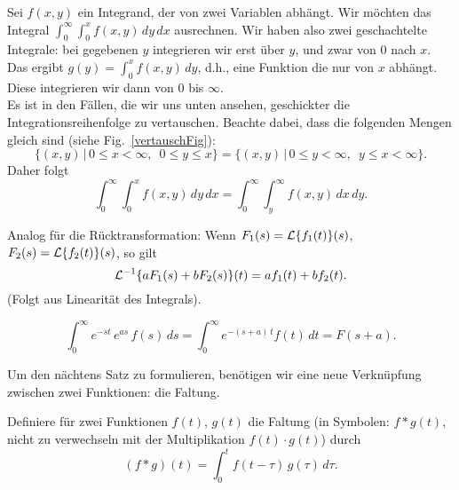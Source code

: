 Sei $f(x,y)$ ein Integrand, der von zwei Variablen abh\"angt. 
Wir m\"ochten das Integral $\int_0^\infty\int_0^x f(x,y)\, dy\, dx$ ausrechnen. 
Wir haben also zwei geschachtelte Integrale: bei gegebenen $y$ integrieren wir erst 
\"uber $y$, und zwar von $0$ nach $x$. Das ergibt $g(y) = \int_0^x f(x,y)\, dy$, 
d.h., eine Funktion die nur von $x$ abh\"angt. Diese integrieren wir dann von $0$ bis $\infty$. \\
Es ist in den F\"allen, die wir uns unten ansehen, geschickter die Integrationsreihenfolge
zu vertauschen. Beachte dabei, dass die folgenden Mengen gleich sind (siehe 
Fig.~\ref{vertauschFig}):
$$ \{(x,y)\, |\, 0\leq x <\infty,\,\,\, 0\leq y\leq x\} 
=  \{(x,y)\, |\, 0\leq y <\infty,\,\,\, y\leq x < \infty\}.
$$
Daher folgt 
$$ \int_0^\infty\int_0^x f(x,y)\, dy\, dx 
= \int_0^\infty\int_y^ \infty f(x,y)\, dx\, dy.$$
\par\bigskip\bigskip

\par\medskip
 Analog  f\"ur die 
R\"ucktransformation: Wenn $F_1(s)={\cal L}\{f_1(t)\}(s)$,
 $F_2(s)={\cal L}\{f_2(t)\}(s)$, so gilt 
 $${\cal L}^{-1}\{a F_1(s)+b F_2(s)\}(t) = a f_1(t)+bf_2(t).$$
(Folgt aus Linearit\"at des Integrals). 
 

\par\medskip
$$ \int_0^\infty e^{-st}\,e^{as}\, f(s)\, ds = \int_0^\infty e^{-(s+a)\,t}f(t)\, dt=F(s+a).$$



Um den n\"achtens Satz zu formulieren, 
ben\"otigen wir eine neue Verkn\"upfung zwischen zwei Funktionen: 
die Faltung.


\begin{sdefi}
Definiere f\"ur zwei Funktionen $f(t)$, $g(t)$ die Faltung (in Symbolen: $f\ast g(t)$, 
nicht zu verwechseln mit der Multiplikation $f(t)\cdot g(t)$) durch
$$ (f\ast g)(t) = \int_0^t f(t-\tau)\, g(\tau)\, d\tau.$$
\end{sdefi}

